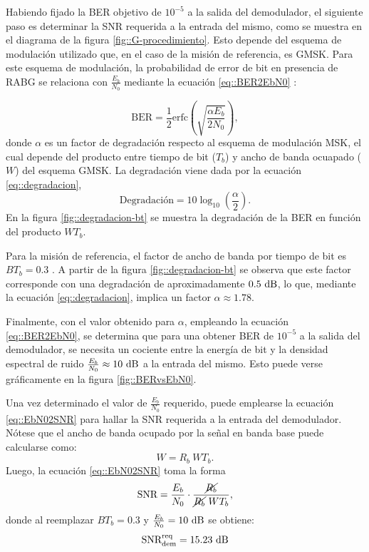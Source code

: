 \documentclass[../../main.tex]{subfiles}
\begin{document}
Habiendo fijado la BER objetivo de $10^{-5}$ a la salida del demodulador, el siguiente paso es determinar la SNR requerida a la entrada del mismo, como se muestra en el diagrama de la figura \ref{fig::G-procedimiento}. Esto depende del esquema de modulación utilizado que, en el caso de la misión de referencia, es GMSK. Para este esquema de modulación, la probabilidad de error de bit en presencia de RABG se relaciona con $\frac{E_b}{N_0}$ mediante la ecuación \ref{eq::BER2EbN0} \cite{haykin}:

\begin{equation}
    \textrm{BER} = \frac{1}{2} \textrm{erfc}\left(\sqrt{\frac{\alpha E_b}{2 N_0}}\right),
    \label{eq::BER2EbN0}
\end{equation}
donde $\alpha$ es un factor de degradación respecto al esquema de modulación MSK, el cual depende del producto entre tiempo de bit ($T_b$) y ancho de banda ocuapado ($W$) del esquema GMSK. La degradación viene dada por la ecuación \ref{eq::degradacion},
\begin{equation}
    \textrm{Degradación} = 10 \log_{10}{\left(\frac{\alpha}{2}\right).}
    \label{eq::degradacion}
\end{equation}
En la figura \ref{fig::degradacion-bt} se muestra la degradación de la BER en función del producto $W T_b$.

Para la misión de referencia, el factor de ancho de banda por tiempo de bit es $BT_b = 0.3$ \cite{BEESAT-9}. A partir de la figura \ref{fig::degradacion-bt} se observa que este factor corresponde con una degradación de aproximadamente $0.5~\textrm{dB}$, lo que, mediante la ecuación \ref{eq::degradacion}, implica un factor $\alpha \approx 1.78$.

Finalmente, con el valor obtenido para $\alpha$, empleando la ecuación \ref{eq::BER2EbN0}, se determina que para una obtener BER de $10^{-5}$ a la salida del demodulador, se necesita un cociente entre la energía de bit y la densidad espectral de ruido $\frac{E_b}{N_0} \approx 10~\textrm{dB}$ a la entrada del mismo. Esto puede verse gráficamente en la figura \ref{fig::BERvsEbN0}.

Una vez determinado el valor de $\frac{E_b}{N_0}$ requerido, puede emplearse la ecuación \ref{eq::EbN02SNR} para hallar la SNR requerida a la entrada del demodulador. Nótese que el ancho de banda ocupado por la señal en banda base puede calcularse como:
\[W = R_b \ W T_b.\]
Luego, la ecuación \ref{eq::EbN02SNR} toma la forma
\[\textrm{SNR} = \frac{E_b}{N_0} \cdot \frac{\cancel{R_b}}{\cancel{R_b} \ W T_b},\] donde al reemplazar $BT_b = 0.3$ y $\frac{E_b}{N_0} = 10~\textrm{dB}$ se obtiene:
\begin{equation}
    \textrm{SNR}^\textrm{req}_\textrm{dem} = 15.23~\textrm{dB}
    \label{eq::SNR-req}
\end{equation}
\end{document}
